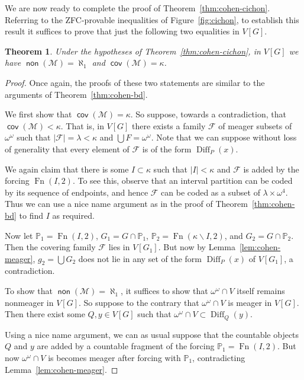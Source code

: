\documentclass[11pt,oneside]{amsbook}
\newcommand{\PP}{\mathbb P}
\newcommand{\Meager}{\mathcal M}
\DeclareMathOperator{\non}{\mathsf{non}}
\DeclareMathOperator{\cov}{\mathsf{cov}}
\DeclareMathOperator{\Diff}{Diff}
\DeclareMathOperator{\Fn}{Fn}
\theoremstyle{definition}
\theoremstyle{plain}
\newtheorem{theorem}{Theorem}[section]
\theoremstyle{definition}
\theoremstyle{remark}
\numberwithin{equation}{section}
\numberwithin{figure}{section}
\begin{document}
We are now ready to complete the proof of Theorem~\ref{thm:cohen-cichon}. Referring to the ZFC-provable inequalities of Figure~\ref{fig:cichon}, to establish this result it suffices to prove that just the following two equalities in $V[G]$.

\begin{theorem}
  \label{thm:cohen-meager}
  Under the hypotheses of Theorem~\ref{thm:cohen-cichon}, in $V[G]$ we have $\non(\Meager)=\aleph_1$ and $\cov(\Meager)=\kappa$.
\end{theorem}

\begin{proof}
 Once again, the proofs of these two statements are similar to the arguments of Theorem~\ref{thm:cohen-bd}.

  We first show that $\cov(\Meager)=\kappa$. So suppose, towards a contradiction, that $\cov(\Meager)<\kappa$. That is, in $V[G]$ there exists a family $\mathcal F$ of meager subsets of $\omega^\omega$ such that $|\mathcal F|=\lambda<\kappa$ and $\bigcup F=\omega^\omega$.  Note that we can suppose without loss of generality that every element of $\mathcal F$ is of the form $\Diff_P(x)$.

  We again claim that there is some $I\subset\kappa$ such that $|I|<\kappa$ and $\mathcal F$ is added by the forcing $\Fn(I,2)$. To see this, observe that an interval partition can be coded by its sequence of endpoints, and hence $\mathcal F$ can be coded as a subset of $\lambda\times\omega^4$. Thus we can use a nice name argument as in the proof of Theorem~\ref{thm:cohen-bd} to find $I$ as required.

  Now let $\PP_1=\Fn(I,2)$, $G_1=G\cap\PP_1$, $\PP_2=\Fn(\kappa\smallsetminus I,2)$, and $G_2=G\cap\PP_2$. Then the covering family $\mathcal F$ lies in $V[G_1]$. But now by Lemma~\ref{lem:cohen-meager}, $g_2=\bigcup G_2$ does not lie in any set of the form $\Diff_P(x)$ of $V[G_1]$, a contradiction.

  To show that $\non(\Meager)=\aleph_1$, it suffices to show that $\omega^\omega\cap V$ itself remains nonmeager in $V[G]$. So suppose to the contrary that $\omega^\omega\cap V$ is meager in $V[G]$. Then there exist some $Q,y\in V[G]$ such that $\omega^\omega\cap V\subset\Diff_Q(y)$.

  Using a nice name argument, we can as usual suppose that the countable objects $Q$ and $y$ are added by a countable fragment of the forcing $\PP_1=\Fn(I,2)$. But now $\omega^\omega\cap V$ is becomes meager after forcing with $\PP_1$, contradicting Lemma~\ref{lem:cohen-meager}.
\end{proof}
\end{document}
